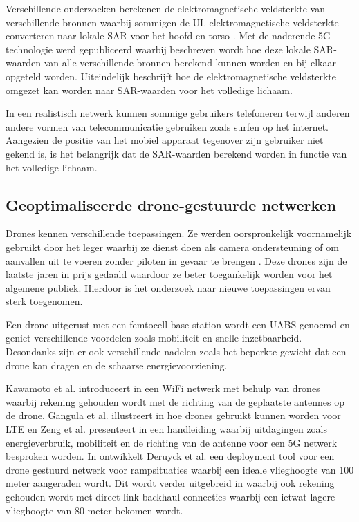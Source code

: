 \documentclass[twocolumn]{phdsymp_dutch}
\begin{document}
Verschillende onderzoeken berekenen de elektromagnetische veldsterkte van verschillende bronnen \cite{J6_originalExposureFormula,J1,J10_RDP,J10.1} 
waarbij sommigen de \gls{UL} elektromagnetische veldsterkte converteren naar lokale \gls{SAR} voor het hoofd en torso \cite{J10_RDP,J10.1}. 
Met de naderende 5G technologie werd \cite{J17_kuehn2019modelling} gepubliceerd waarbij beschreven wordt hoe 
deze lokale  \gls{SAR}-waarden van alle verschillende bronnen berekend kunnen worden en bij elkaar opgeteld worden.
Uiteindelijk beschrijft \cite{J22_plets2015joint} hoe de elektromagnetische veldsterkte omgezet kan worden 
naar \gls{SAR}-waarden voor het volledige lichaam.

In een realistisch netwerk kunnen sommige gebruikers telefoneren terwijl anderen andere vormen van telecommunicatie gebruiken zoals 
surfen op het internet. Aangezien de positie van het mobiel apparaat tegenover zijn gebruiker niet gekend is,
is het belangrijk dat de \gls{SAR}-waarden berekend worden in functie van het volledige lichaam. 

\subsection{Geoptimaliseerde drone-gestuurde netwerken}

Drones kennen verschillende toepassingen. Ze werden oorspronkelijk voornamelijk gebruikt door het leger waarbij ze dienst doen  
als camera ondersteuning of om aanvallen uit te voeren zonder piloten in gevaar te brengen \cite{U12}. 
Deze drones zijn de laatste jaren in prijs gedaald waardoor ze beter toegankelijk worden
voor het algemene publiek. Hierdoor is het onderzoek naar nieuwe toepassingen ervan sterk toegenomen.

Een drone uitgerust met een femtocell base station wordt een \gls{UABS} genoemd en 
geniet verschillende voordelen zoals mobiliteit en snelle inzetbaarheid.
Desondanks zijn er ook verschillende nadelen zoals het beperkte gewicht dat een drone kan dragen 
en de schaarse energievoorziening.

Kawamoto et al. introduceert in \cite{U11} een WiFi netwerk  met behulp van drones waarbij rekening gehouden wordt
met de richting van de geplaatste antennes op de drone. 
Gangula et al. illustreert in \cite{U10} hoe drones gebruikt kunnen worden voor \gls{LTE}
en
Zeng et al. presenteert in  \cite{U12} een handleiding waarbij uitdagingen   zoals energieverbruik, mobiliteit en 
de richting van de antenne voor een 5G netwerk besproken worden. 
In \cite{J2} ontwikkelt Deruyck et al. een deployment tool voor een drone gestuurd netwerk voor rampsituaties waarbij 
een ideale vlieghoogte van 100 meter aangeraden wordt.  
Dit wordt verder uitgebreid in \cite{U1} waarbij ook rekening gehouden wordt met 
 direct-link backhaul connecties waarbij een ietwat lagere vlieghoogte van 80 meter bekomen wordt.
\end{document}
